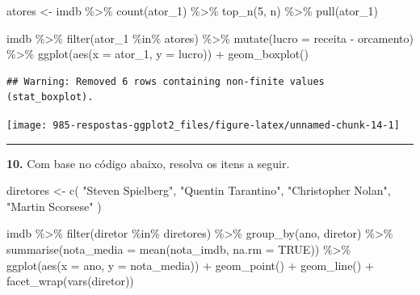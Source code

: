 \documentclass[
]{book}
\newenvironment{Shaded}{\begin{snugshade}}{\end{snugshade}}
\newcommand{\AttributeTok}[1]{\textcolor[rgb]{0.77,0.63,0.00}{#1}}
\newcommand{\ConstantTok}[1]{\textcolor[rgb]{0.00,0.00,0.00}{#1}}
\newcommand{\DecValTok}[1]{\textcolor[rgb]{0.00,0.00,0.81}{#1}}
\newcommand{\FunctionTok}[1]{\textcolor[rgb]{0.00,0.00,0.00}{#1}}
\newcommand{\NormalTok}[1]{#1}
\newcommand{\OtherTok}[1]{\textcolor[rgb]{0.56,0.35,0.01}{#1}}
\newcommand{\SpecialCharTok}[1]{\textcolor[rgb]{0.00,0.00,0.00}{#1}}
\newcommand{\StringTok}[1]{\textcolor[rgb]{0.31,0.60,0.02}{#1}}
\begin{document}
\begin{Shaded}
\begin{Highlighting}[]
\NormalTok{atores }\OtherTok{\textless{}{-}}\NormalTok{ imdb }\SpecialCharTok{\%\textgreater{}\%} 
  \FunctionTok{count}\NormalTok{(ator\_1) }\SpecialCharTok{\%\textgreater{}\%} 
  \FunctionTok{top\_n}\NormalTok{(}\DecValTok{5}\NormalTok{, n) }\SpecialCharTok{\%\textgreater{}\%} 
  \FunctionTok{pull}\NormalTok{(ator\_1)}

\NormalTok{imdb }\SpecialCharTok{\%\textgreater{}\%} 
  \FunctionTok{filter}\NormalTok{(ator\_1 }\SpecialCharTok{\%in\%}\NormalTok{ atores) }\SpecialCharTok{\%\textgreater{}\%} 
  \FunctionTok{mutate}\NormalTok{(}\AttributeTok{lucro =}\NormalTok{ receita }\SpecialCharTok{{-}}\NormalTok{ orcamento) }\SpecialCharTok{\%\textgreater{}\%} 
  \FunctionTok{ggplot}\NormalTok{(}\FunctionTok{aes}\NormalTok{(}\AttributeTok{x =}\NormalTok{ ator\_1, }\AttributeTok{y =}\NormalTok{ lucro)) }\SpecialCharTok{+}
  \FunctionTok{geom\_boxplot}\NormalTok{()}
\end{Highlighting}
\end{Shaded}

\begin{verbatim}
## Warning: Removed 6 rows containing non-finite values (stat_boxplot).
\end{verbatim}

\begin{center}\texttt{[image: 985-respostas-ggplot2\_files/figure-latex/unnamed-chunk-14-1]} \end{center}

\begin{center}\rule{0.5\linewidth}{0.5pt}\end{center}

\textbf{10.} Com base no código abaixo, resolva os itens a seguir.

\begin{Shaded}
\begin{Highlighting}[]
\NormalTok{diretores }\OtherTok{\textless{}{-}} \FunctionTok{c}\NormalTok{(}
  \StringTok{"Steven Spielberg"}\NormalTok{, }
  \StringTok{"Quentin Tarantino"}\NormalTok{, }
  \StringTok{"Christopher Nolan"}\NormalTok{,}
  \StringTok{"Martin Scorsese"}
\NormalTok{)}

\NormalTok{imdb }\SpecialCharTok{\%\textgreater{}\%} 
  \FunctionTok{filter}\NormalTok{(diretor }\SpecialCharTok{\%in\%}\NormalTok{ diretores) }\SpecialCharTok{\%\textgreater{}\%} 
  \FunctionTok{group\_by}\NormalTok{(ano, diretor) }\SpecialCharTok{\%\textgreater{}\%} 
  \FunctionTok{summarise}\NormalTok{(}\AttributeTok{nota\_media =} \FunctionTok{mean}\NormalTok{(nota\_imdb, }\AttributeTok{na.rm =} \ConstantTok{TRUE}\NormalTok{)) }\SpecialCharTok{\%\textgreater{}\%} 
  \FunctionTok{ggplot}\NormalTok{(}\FunctionTok{aes}\NormalTok{(}\AttributeTok{x =}\NormalTok{ ano, }\AttributeTok{y =}\NormalTok{ nota\_media)) }\SpecialCharTok{+}
  \FunctionTok{geom\_point}\NormalTok{() }\SpecialCharTok{+}
  \FunctionTok{geom\_line}\NormalTok{() }\SpecialCharTok{+}
  \FunctionTok{facet\_wrap}\NormalTok{(}\FunctionTok{vars}\NormalTok{(diretor))}
\end{Highlighting}
\end{Shaded}
\end{document}
